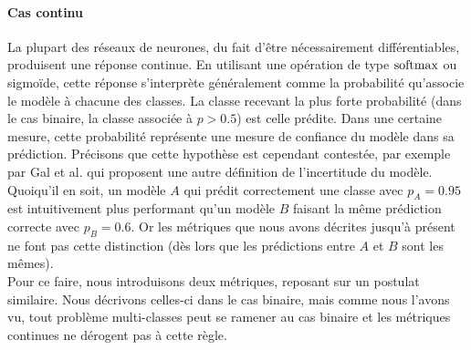 \paragraph{Cas continu}
La plupart des réseaux de neurones, du fait d'être nécessairement différentiables, produisent une réponse continue. En utilisant une opération de type $\operatorname{softmax}$ ou sigmoïde, cette réponse s'interprète généralement comme la probabilité qu'associe le modèle à chacune des classes. La classe recevant la plus forte probabilité (dans le cas binaire, la classe associée à $p>0.5$) est celle prédite. Dans une certaine mesure, cette probabilité représente une mesure de confiance du modèle dans sa prédiction. Précisons que cette hypothèse est cependant contestée, par exemple par Gal et al. \cite{galDropoutBayesianApproximation2015} qui proposent une autre définition de l'incertitude du modèle. Quoiqu'il en soit, un modèle $A$ qui prédit correctement une classe avec $p_A = 0.95$ est intuitivement plus performant qu'un modèle $B$ faisant la même prédiction correcte avec $p_B=0.6$. Or les métriques que nous avons décrites jusqu'à présent ne font pas cette distinction (dès lors que les prédictions entre $A$ et $B$ sont les mêmes). \\
Pour ce faire, nous introduisons deux métriques, reposant sur un postulat similaire. Nous décrivons celles-ci dans le cas binaire, mais comme nous l'avons vu, tout problème multi-classes peut se ramener au cas binaire et les métriques continues ne dérogent pas à cette règle. 
